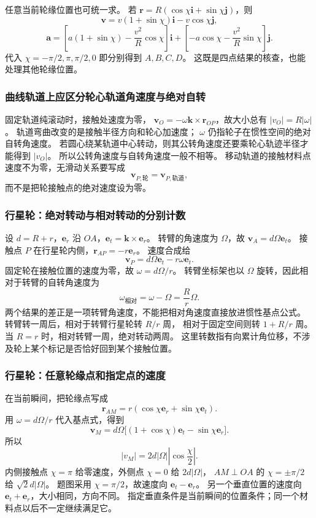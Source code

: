 \documentclass[UTF8,zihao=-4,fontset=fandol,a4paper]{ctexart}
\newcommand{\vect}[1]{\bm{#1}}
\begin{document}
任意当前轮缘位置也可统一求。
若 $\vect r=R(\cos\chi\vect i+\sin\chi\vect j)$，则
\[
\vect v=v(1+\sin\chi)\vect i-v\cos\chi\vect j,
\]
\[
\vect a=\left[a(1+\sin\chi)-\frac{v^2}{R}\cos\chi\right]\vect i
+\left[-a\cos\chi-\frac{v^2}{R}\sin\chi\right]\vect j.
\]
代入 $\chi=-\pi/2,\pi,\pi/2,0$ 即分别得到 $A,B,C,D$。
这既是四点结果的核查，也能处理其他轮缘位置。

\subsubsection*{曲线轨道上应区分轮心轨道角速度与绝对自转}
固定轨道纯滚动时，接触处速度为零，
$\vect v_O=-\omega\vect k\times\vect r_{OP}$，故大小总有 $|v_O|=R|\omega|$。
轨道弯曲改变的是接触半径方向和轮心加速度；
$\omega$ 仍指轮子在惯性空间的绝对自转角速度。
若圆心绕某轨道中心转动，则其公转角速度还要乘轮心轨迹半径才能得到 $|v_O|$。
所以公转角速度与自转角速度一般不相等。
移动轨道的接触材料点速度不为零，无滑动关系要写成
\[
\vect v_{P,\text{轮}}=\vect v_{P,\text{轨道}},
\]
而不是把轮接触点的绝对速度设为零。

\subsubsection*{行星轮：绝对转动与相对转动的分别计数}
设 $d=R+r$，$\vect e_r$ 沿 $OA$，$\vect e_t=\vect k\times\vect e_r$。
转臂的角速度为 $\Omega$，故 $\vect v_A=d\Omega\vect e_t$。
接触点 $P$ 在行星轮内侧，$\vect r_{AP}=-r\vect e_r$。
速度合成给
\[
\vect v_P=d\Omega\vect e_t-r\omega\vect e_t.
\]
固定轮在接触位置的速度为零，故 $\omega=d\Omega/r$。
转臂坐标架也以 $\Omega$ 旋转，因此相对于转臂的自转角速度为
\[
\omega_{\text{相对}}=\omega-\Omega=\frac Rr\Omega.
\]
两个结果的差正是一项转臂角速度，不能把相对角速度直接放进惯性基点公式。
转臂转一周后，相对于转臂行星轮转 $R/r$ 周，
相对于固定空间则转 $1+R/r$ 周。
当 $R=r$ 时，相对转臂一周，绝对转动两周。
这里转数指有向累计角位移，不涉及轮上某个标记是否恰好回到某个接触位置。

\subsubsection*{行星轮：任意轮缘点和指定点的速度}
在当前瞬间，把轮缘点写成
\[
\vect r_{AM}=r(\cos\chi\vect e_r+\sin\chi\vect e_t).
\]
用 $\omega=d\Omega/r$ 代入基点式，得到
\[
\vect v_M=d\Omega\bigl[(1+\cos\chi)\vect e_t-\sin\chi\vect e_r\bigr].
\]
所以
\[
|v_M|=2d|\Omega|\left|\cos\frac\chi2\right|.
\]
内侧接触点 $\chi=\pi$ 给零速度，外侧点 $\chi=0$ 给 $2d|\Omega|$，
$AM\perp OA$ 的 $\chi=\pm\pi/2$ 给 $\sqrt2d|\Omega|$。
题图采用 $\chi=\pi/2$，故速度向 $\vect e_t-\vect e_r$。
另一个垂直位置的速度向 $\vect e_t+\vect e_r$，大小相同，方向不同。
指定垂直条件是当前瞬间的位置条件；同一个材料点以后不一定继续满足它。
\end{document}

